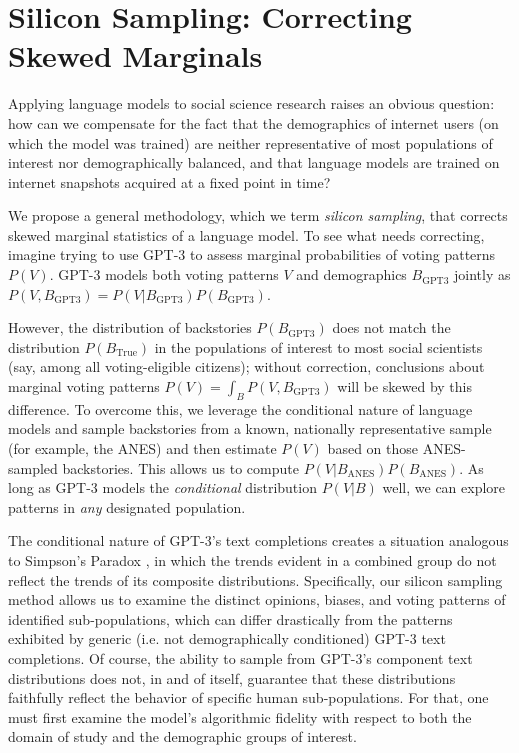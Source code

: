 \documentclass[11pt]{article}
\begin{document}

\section{Silicon Sampling: Correcting Skewed Marginals}
\label{sec:siliconsampling}

Applying language models to social science research raises an obvious question: how can we compensate for the fact that the demographics of internet users (on which the model was trained) are neither  representative of most populations of interest nor demographically balanced, and that language models are trained on internet snapshots acquired at a fixed point in time?

We propose a general methodology, which we term \emph{silicon sampling}, that corrects skewed marginal statistics of a language model. To see what needs correcting, imagine trying to use GPT-3 to assess marginal probabilities of voting patterns $P(V)$.
GPT-3 models both voting patterns $V$ and demographics $B_{\mathrm{GPT3}}$ jointly as $P(V,B_{\mathrm{GPT3}}){=}P(V|B_{\mathrm{GPT3}})P(B_{\mathrm{GPT3}})$.

However, the distribution of backstories $P(B_{\mathrm{GPT3}})$ does not match the distribution $P(B_{\mathrm{True}})$ in the populations of interest to most social scientists (say, among all voting-eligible citizens); without correction, conclusions about marginal voting patterns $P(V){=}\int_{B} P(V,B_{\mathrm{GPT3}})$ will be skewed by this difference.
To overcome this, we leverage the conditional nature of language models and sample backstories from a known, nationally representative sample (for example, the ANES) and then estimate $P(V)$ based on those ANES-sampled backstories.
This allows us to compute $P(V|B_{\mathrm{ANES}})P(B_{\mathrm{ANES}})$. As long as GPT-3 models the \emph{conditional} distribution $P(V|B)$ well, we can explore patterns in \textit{any} designated population.

The conditional nature of GPT-3's text completions creates a situation analogous to Simpson's Paradox \citep{Simpson1951}, in which the trends evident in a combined group do not reflect the trends of its composite distributions. Specifically, our silicon sampling method allows us to examine the distinct opinions, biases, and voting patterns of identified sub-populations, which can differ drastically from the patterns exhibited by generic (i.e. not demographically conditioned) GPT-3 text completions.
Of course, the ability to sample from GPT-3's component text distributions does not, in and of itself, guarantee that these distributions faithfully reflect the behavior of specific human sub-populations. For that, one must first examine the model's algorithmic fidelity with respect to both the domain of study and the demographic groups of interest. %
\end{document}
